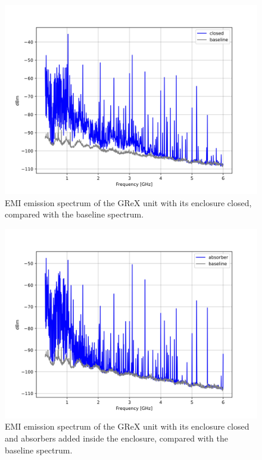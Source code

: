 \documentclass[12pt,a4paper,oneside]{article}
\begin{document}
\begin{figure}[H]
\centering
\includegraphics[width=0.9\linewidth]{Figures/closed_comparison_spectrum.jpg}
\caption{EMI emission spectrum of the GReX unit with its enclosure closed, compared with the baseline spectrum.}
\label{fig:closed_result}
\end{figure}
%
\begin{figure}[H]
\centering
\includegraphics[width=0.9\linewidth]{Figures/absorber_comparison_spectrum.jpg}
\caption{EMI emission spectrum of the GReX unit with its enclosure closed and absorbers added inside the enclosure, compared with the baseline spectrum.}
\label{fig:absorber_comparison_spectrum}
\end{figure}
\end{document}
